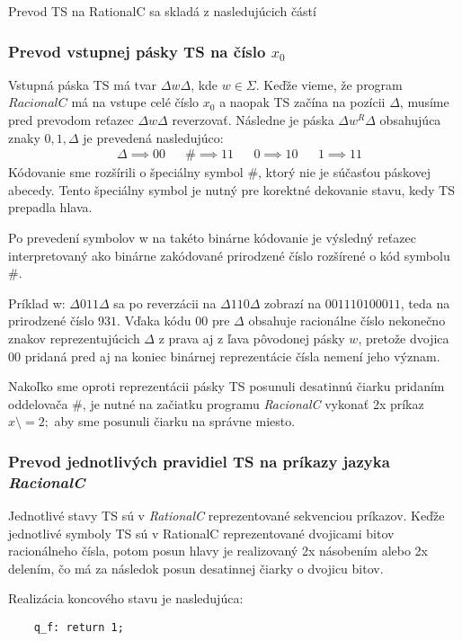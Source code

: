\documentclass[10pt]{article}
\begin{document}
Prevod TS na RationalC sa skladá z nasledujúcich částí
\subsubsection*{Prevod vstupnej pásky TS na číslo $x_0$}
    Vstupná páska TS má tvar $\Delta w \Delta$, kde $w \in \Sigma$. Keďže vieme, že program
    $RacionalC$ má na vstupe celé číslo $x_0$ a naopak TS začína na pozícii $\Delta$, musíme
    pred prevodom reťazec $\Delta w \Delta$ reverzovať. 
    Následne je páska $\Delta w^R \Delta$ obsahujúca znaky $0,1,\Delta$ je prevedená nasledujúco:
    \begin{align*}
        &\Delta \implies 00 &  & \#  \implies 11 &
        &0 \implies 10 &  &1 \implies 11 
    \end{align*}
    Kódovanie sme rozšírili o špeciálny symbol $\#$, ktorý nie je súčasťou páskovej abecedy.
    Tento špeciálny symbol je nutný pre korektné dekovanie stavu, kedy TS prepadla hlava.

    Po prevedení symbolov w na takéto binárne kódovanie je výsledný reťazec interpretovaný ako
    binárne zakódované prirodzené číslo rozšírené o kód symbolu $\#$.

    Príklad w: $\Delta011\Delta$ sa po reverzácii na $\Delta110\Delta$ zobrazí na $00 11 10 10 00
    11$, teda na prirodzené číslo $931$. Vďaka kódu $00$ pre $\Delta$ obsahuje racionálne číslo nekonečno znakov
    reprezentujúcich $\Delta$ z prava aj z ľava pôvodonej pásky $w$, pretože dvojica 00 pridaná
    pred aj na koniec binárnej reprezentácie čísla nemení jeho význam.

    Nakoľko sme oproti reprezentácii pásky TS posunuli desatinnú čiarku pridaním oddelovača $\#$, je
    nutné na začiatku programu \textit{RacionalC} vykonať 2x príkaz $x \setminus = 2;$ aby sme posunuli čiarku na
    správne miesto.

\subsubsection*{Prevod jednotlivých pravidiel TS na príkazy jazyka \textit{RacionalC}}
    Jednotlivé stavy TS sú v \textit{RationalC} reprezentované sekvenciou príkazov. 
    Keďže jednotlivé symboly TS sú v RationalC reprezentované dvojicami bitov racionálneho čísla, potom posun hlavy je
    realizovaný 2x násobením alebo 2x delením, čo má za následok posun desatinnej čiarky o
    dvojicu bitov.

    Realizácia koncového stavu je nasledujúca:
    \begin{verbatim}
    q_f: return 1;
    \end{verbatim}
\end{document}
